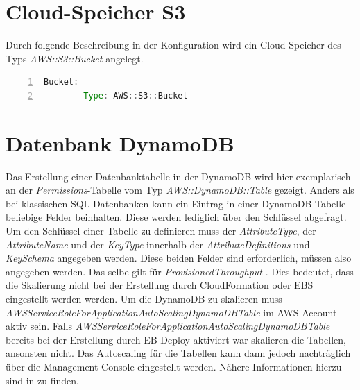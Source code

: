 \documentclass[a4paper, 12pt]{scrreprt}
\renewcommand\_{\textunderscore\allowbreak}
\begin{document}
\section{Cloud-Speicher S3}
Durch folgende Beschreibung in der Konfiguration wird ein Cloud-Speicher des Typs \textit{AWS::S3::Bucket} angelegt.
\begin{lstlisting}[xleftmargin=\parindent,numbers=left,numberstyle=\small,numbersep=8pt,frame=L,mathescape=true, basicstyle=\small, language=Java, lineskip={1.0pt}]
Bucket:
        Type: AWS::S3::Bucket
\end{lstlisting}          


\section{Datenbank DynamoDB}
Das Erstellung einer Datenbanktabelle in der DynamoDB wird hier exemplarisch an der \textit{Permissions}-Tabelle vom Typ \textit{AWS::DynamoDB::Table} gezeigt. Anders als bei klassischen SQL-Datenbanken kann ein Eintrag in einer DynamoDB-Tabelle beliebige Felder beinhalten. Diese werden lediglich über den Schlüssel abgefragt. Um den Schlüssel einer Tabelle zu definieren muss der \textit{AttributeType}, der \textit{AttributeName} und der \textit{KeyType} innerhalb der \textit{AttributeDefinitions} und \textit{KeySchema} angegeben werden. Diese beiden Felder sind erforderlich, müssen also angegeben werden. Das selbe gilt für \textit{ProvisionedThroughput} \cite{AWSDa}.
Dies bedeutet, dass die Skalierung nicht bei der Erstellung durch CloudFormation oder EBS eingestellt werden werden. Um die DynamoDB zu skalieren muss \textit{AWSServiceRoleForApplicationAutoScaling\_DynamoDBTable} im AWS-Account aktiv sein. Falls \textit{AWSServiceRoleForApplicationAutoScaling\_DynamoDBTable} bereits bei der Erstellung durch EB-Deploy aktiviert war skalieren die Tabellen,  ansonsten nicht. Das Autoscaling für die Tabellen kann dann jedoch nachträglich über die Management-Console eingestellt werden. Nähere Informationen hierzu sind in \cite{AWSDb} zu finden.



\end{document}
